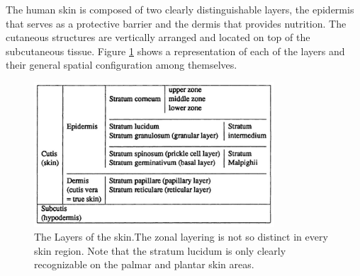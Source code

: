 The human skin is composed of two clearly distinguishable layers, the epidermis that serves as a protective barrier and the dermis that provides nutrition. The cutaneous structures are vertically arranged and located on top of the subcutaneous tissue. Figure \ref{layerTab} shows a representation of each of the layers and their general spatial configuration among themselves.

\begin{figure}[ht]
\centering
\includegraphics[width=0.8\textwidth]{images/skinLayers.png}
\caption{The Layers of the skin.The zonal layering is not so distinct in every skin region. Note that the stratum lucidum is only clearly recognizable on the palmar and plantar skin areas.\citep{boucsein2013electrodermal}}
\label{layerTab}
\end{figure}

